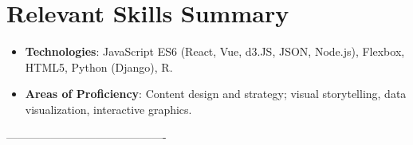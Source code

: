 \documentclass[letterpaper,11pt]{article}
\newcommand{\resumeItem}[2]{
  \item\small{
    \textbf{#1}{: #2 \vspace{-2pt}}
  }
}
\newcommand{\resumeSubItem}[2]{\resumeItem{#1}{#2}\vspace{-4pt}}
\newcommand{\resumeSubHeadingListStart}{\begin{itemize}[leftmargin=*]}
\newcommand{\resumeSubHeadingListEnd}{\end{itemize}}
\begin{document}
\section{Relevant Skills Summary}
  \resumeSubHeadingListStart
    \resumeSubItem{Technologies}
        {JavaScript ES6 (React, Vue, d3.JS, JSON, Node.js), Flexbox, HTML5, Python (Django), R.}
      \item{
     \textbf{Areas of Proficiency}{: Content design and strategy; visual storytelling, data visualization, interactive graphics.}
    }
  \resumeSubHeadingListEnd


-------------------------------------------
\end{document}
